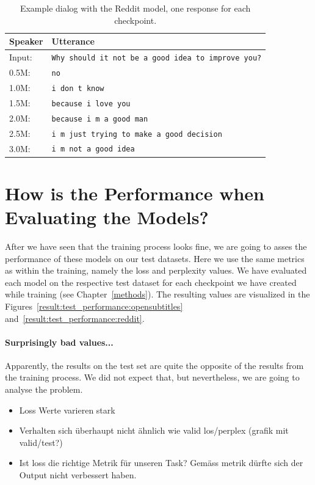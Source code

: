 \begin{table}[H]
	\centering
	\begin{adjustbox}{max width=\textwidth}
		\begin{tabular}{ll}
			\toprule
			Speaker & Utterance\\ \midrule
			Input: 	& \texttt{Why should it not be a good idea to improve you?}\\
			0.5M: 	& \texttt{no}\\
			1.0M: 	& \texttt{i don t know}\\
			1.5M:	& \texttt{because i love you}\\
			2.0M:	& \texttt{because i m a good man}\\
			2.5M:	& \texttt{i m just trying to make a good decision}\\
			3.0M:	& \texttt{i m not a good idea}\\
			\bottomrule
		\end{tabular}
	\end{adjustbox}
	\caption{Example dialog with the Reddit model, one response for each checkpoint.}
	\label{results:example_output2:OpenSubtitle}
\end{table}

\section{How is the Performance when Evaluating the Models?}
After we have seen that the training process looks fine, we are going to asses the performance of these models on our test datasets. Here we use the same metrics as within the training, namely the loss and perplexity values. We have evaluated each model on the respective test dataset for each checkpoint we have created while training (see Chapter~\ref{methods}). The resulting values are visualized in the Figures~\ref{result:test_performance:opensubtitles} and~\ref{result:test_performance:reddit}.

\paragraph{Surprisingly bad values...}Apparently, the results on the test set are quite the opposite of the results from the training process. We did not expect that, but nevertheless, we are going to analyse the problem.
\begin{itemize}
	\item Loss Werte varieren stark
	\item Verhalten sich überhaupt nicht ähnlich wie valid los/perplex (grafik mit valid/test?) 
	\item Ist loss die richtige Metrik für unseren Task? Gemäss metrik dürfte sich der Output nicht verbessert haben.
\end{itemize}

